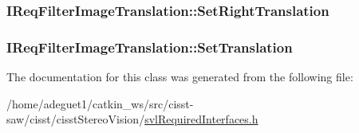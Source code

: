 \hypertarget{class_i_req_filter_image_translation_a6fcebfa71603497d6dfc6079ffcd2a64}{
\subsubsection[{Set\-Right\-Translation}]{ I\-Req\-Filter\-Image\-Translation\-::\-Set\-Right\-Translation}}\label{class_i_req_filter_image_translation_a6fcebfa71603497d6dfc6079ffcd2a64}
\hypertarget{class_i_req_filter_image_translation_aa40f24911962a87d74a797d9e24ad16a}{
\subsubsection[{Set\-Translation}]{ I\-Req\-Filter\-Image\-Translation\-::\-Set\-Translation}}\label{class_i_req_filter_image_translation_aa40f24911962a87d74a797d9e24ad16a}


The documentation for this class was generated from the following file\-:\begin{DoxyCompactItemize}
\item 
/home/adeguet1/catkin\-\_\-ws/src/cisst-\/saw/cisst/cisst\-Stereo\-Vision/\hyperlink{svl_required_interfaces_8h}{svl\-Required\-Interfaces.\-h}\end{DoxyCompactItemize}
